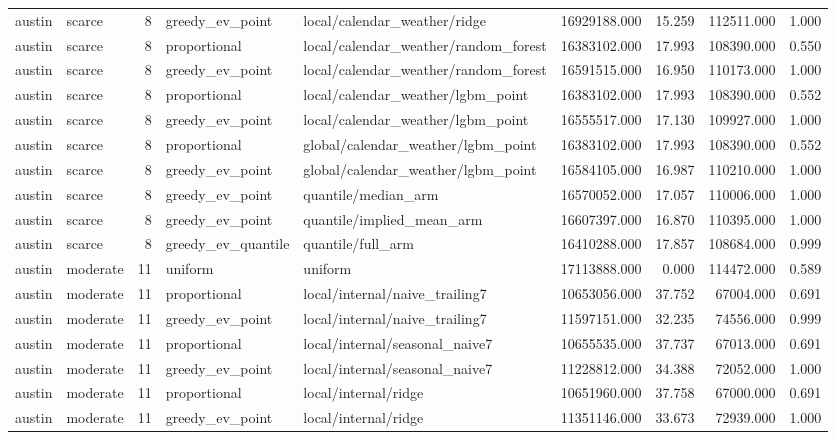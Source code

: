 \begin{tabular}{llrllrrrr}
austin & scarce & 8 & greedy\_ev\_point & local/calendar\_weather/ridge & 16929188.000 & 15.259 & 112511.000 & 1.000 \\
austin & scarce & 8 & proportional & local/calendar\_weather/random\_forest & 16383102.000 & 17.993 & 108390.000 & 0.550 \\
austin & scarce & 8 & greedy\_ev\_point & local/calendar\_weather/random\_forest & 16591515.000 & 16.950 & 110173.000 & 1.000 \\
austin & scarce & 8 & proportional & local/calendar\_weather/lgbm\_point & 16383102.000 & 17.993 & 108390.000 & 0.552 \\
austin & scarce & 8 & greedy\_ev\_point & local/calendar\_weather/lgbm\_point & 16555517.000 & 17.130 & 109927.000 & 1.000 \\
austin & scarce & 8 & proportional & global/calendar\_weather/lgbm\_point & 16383102.000 & 17.993 & 108390.000 & 0.552 \\
austin & scarce & 8 & greedy\_ev\_point & global/calendar\_weather/lgbm\_point & 16584105.000 & 16.987 & 110210.000 & 1.000 \\
austin & scarce & 8 & greedy\_ev\_point & quantile/median\_arm & 16570052.000 & 17.057 & 110006.000 & 1.000 \\
austin & scarce & 8 & greedy\_ev\_point & quantile/implied\_mean\_arm & 16607397.000 & 16.870 & 110395.000 & 1.000 \\
austin & scarce & 8 & greedy\_ev\_quantile & quantile/full\_arm & 16410288.000 & 17.857 & 108684.000 & 0.999 \\
austin & moderate & 11 & uniform & uniform & 17113888.000 & 0.000 & 114472.000 & 0.589 \\
austin & moderate & 11 & proportional & local/internal/naive\_trailing7 & 10653056.000 & 37.752 & 67004.000 & 0.691 \\
austin & moderate & 11 & greedy\_ev\_point & local/internal/naive\_trailing7 & 11597151.000 & 32.235 & 74556.000 & 0.999 \\
austin & moderate & 11 & proportional & local/internal/seasonal\_naive7 & 10655535.000 & 37.737 & 67013.000 & 0.691 \\
austin & moderate & 11 & greedy\_ev\_point & local/internal/seasonal\_naive7 & 11228812.000 & 34.388 & 72052.000 & 1.000 \\
austin & moderate & 11 & proportional & local/internal/ridge & 10651960.000 & 37.758 & 67000.000 & 0.691 \\
austin & moderate & 11 & greedy\_ev\_point & local/internal/ridge & 11351146.000 & 33.673 & 72939.000 & 1.000 \\

\end{tabular}
